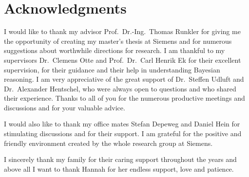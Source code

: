 \chapter{Acknowledgments}
I would like to thank my advisor Prof.\ Dr.-Ing.\ Thomas Runkler for giving me the opportunity of creating my master's thesis at Siemens and for numerous suggestions about worthwhile directions for research.
I am thankful to my supervisors Dr.\ Clemens Otte and Prof.\ Dr.\ Carl Henrik Ek for their excellent supervision, for their guidance and their help in understanding Bayesian reasoning.
I am very appreciative of the great support of Dr.\ Steffen Udluft and Dr.\ Alexander Hentschel, who were always open to questions and who shared their experience.
Thanks to all of you for the numerous productive meetings and discussions and for your valuable advice.

I would also like to thank my office mates Stefan Depeweg and Daniel Hein for stimulating discussions and for their support.
I am grateful for the positive and friendly environment created by the whole research group at Siemens.

I sincerely thank my family for their caring support throughout the years and above all I want to thank Hannah for her endless support, love and patience.
